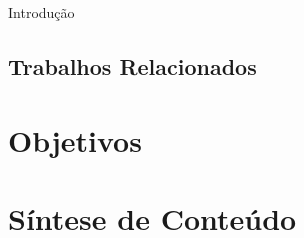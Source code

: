 \begin{chapter}{Introdução}
\subsection{Trabalhos Relacionados}

\section{Objetivos}

\section{Síntese de Conteúdo}


\end{chapter}
